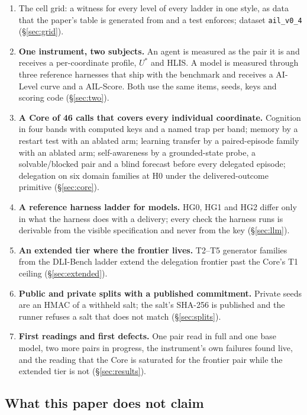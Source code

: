 \documentclass[11pt]{article}
\theoremstyle{definition}
\begin{document}
\begin{enumerate}[leftmargin=*,itemsep=2pt]
\item The cell grid: a witness for every level of every ladder in one style, as data that the paper's table is generated from and a test enforces; dataset \texttt{ail\_v0\_4} (\S\ref{sec:grid}).
\item \textbf{One instrument, two subjects.} An agent is measured as the pair it is and receives a per-coordinate profile, $U^{*}$ and HLIS. A model is measured through three reference harnesses that ship with the benchmark and receives a AI-Level curve and a AIL-Score. Both use the same items, seeds, keys and scoring code (\S\ref{sec:two}).
\item \textbf{A Core of 46 calls that covers every individual coordinate.} Cognition in four bands with computed keys and a named trap per band; memory by a restart test with an ablated arm; learning transfer by a paired-episode family with an ablated arm; self-awareness by a grounded-state probe, a solvable/blocked pair and a blind forecast before every delegated episode; delegation on six domain families at H0 under the delivered-outcome primitive (\S\ref{sec:core}).
\item \textbf{A reference harness ladder for models.} HG0, HG1 and HG2 differ only in what the harness does with a delivery; every check the harness runs is derivable from the visible specification and never from the key (\S\ref{sec:llm}).
\item \textbf{An extended tier where the frontier lives.} T2--T5 generator families from the DLI-Bench ladder extend the delegation frontier past the Core's T1 ceiling (\S\ref{sec:extended}).
\item \textbf{Public and private splits with a published commitment.} Private seeds are an HMAC of a withheld salt; the salt's SHA-256 is published and the runner refuses a salt that does not match (\S\ref{sec:splits}).
\item \textbf{First readings and first defects.} One pair read in full and one base model, two more pairs in progress, the instrument's own failures found live, and the reading that the Core is saturated for the frontier pair while the extended tier is not (\S\ref{sec:results}).
\end{enumerate}

\subsection{What this paper does not claim}
\end{document}
